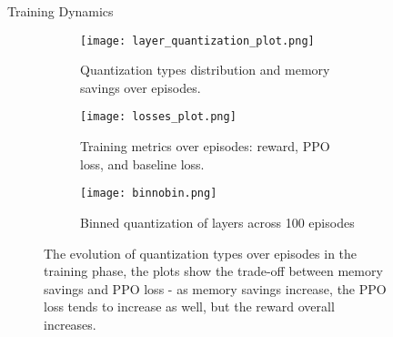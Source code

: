 \documentclass[final]{beamer}
\newlength{\sepwidth}
\newlength{\colwidth}
\newcommand{\separatorcolumn}{\begin{column}{\sepwidth}\end{column}}
\begin{document}
\begin{frame}[t]
\begin{columns}[t]
\begin{column}{\colwidth}
				
				\begin{block}{Training Dynamics}
					\vspace{-0.6em}
					\begin{figure}[ht]
						\centering
						\begin{subfigure}[b]{0.3\linewidth}
							\texttt{[image: layer\_quantization\_plot.png]}
							\caption{\small Quantization types distribution and memory savings over episodes.}
						\end{subfigure}
						\hfill
						\begin{subfigure}[b]{0.32\linewidth}
							\texttt{[image: losses\_plot.png]}
							\caption{\small Training metrics over episodes: reward, PPO loss, and baseline loss.}
						\end{subfigure}
						\hfill
						\begin{subfigure}[b]{0.27\linewidth}
							\texttt{[image: binnobin.png]}
							\caption{\small Binned quantization of layers across 100 episodes}
							\label{subfig:reward_trend}
						\end{subfigure}
						
						\caption{\small The evolution of quantization types over episodes in the training phase, the plots show the trade-off between memory savings and PPO loss - as memory savings increase, the PPO loss tends to increase as well, but the reward overall increases.}
						\label{fig:training_plots}
					\end{figure}					
				\end{block}
				
			\end{column}
			
			\separatorcolumn
			
			\begin{column}{\colwidth}
				

\end{column}
\end{columns}
\end{frame}
\end{document}
